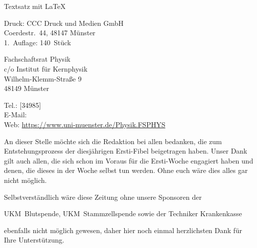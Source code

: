 \begin{multicols*}{2}
{	Textsatz mit \LaTeX
	
	Druck: CCC Druck und Medien GmbH\\
	Coerdestr.\ 44, 48147 Münster\\
	1.~Auflage: 140~Stück

	\vspace{-1ex}
	\vspace{-1ex}
	Fachschaftsrat Physik\\
	c/o Institut für Kernphysik\\
	Wilhelm-Klemm-Straße 9\\
	48149 Münster
	
	Tel.: [34985]\\
	E-Mail: \\
	Web: \url{https://www.uni-muenster.de/Physik.FSPHYS}
\par}

\footnotesize
An dieser Stelle möchte sich die Redaktion bei allen bedanken, die zum Entstehungsprozess der diesjährigen Ersti-Fibel beigetragen haben.
%
Unser Dank gilt auch allen, die sich schon im Voraus für die Ersti-Woche engagiert haben und denen, die dieses in der Woche selbst tun werden.
Ohne euch wäre dies alles gar nicht möglich.

Selbstverständlich wäre diese Zeitung ohne unsere Sponsoren der
\begin{center}
	UKM~Blutspende, UKM~Stammzellspende sowie der Techniker Krankenkasse
\end{center}
ebenfalls nicht möglich gewesen, daher hier noch einmal herzlichsten Dank für Ihre Unterstützung.
\end{multicols*}

